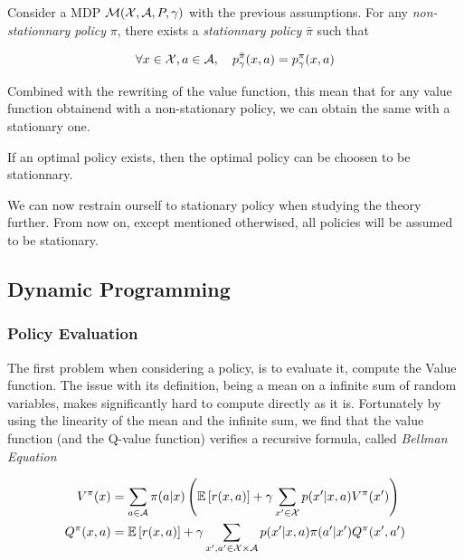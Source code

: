 \begin{theorem}[Bertsekas, 2007]
    Consider a MDP $\mathcal{M}(\mathcal{X}, \mathcal{A}, P, \gamma)$ with the previous assumptions. For any \emph{non-stationnary policy} $\pi$, there exists a \emph{stationnary policy} $\bar{\pi}$ such that 

    \[ \forall x\in \mathcal{X}, a \in \mathcal{A}, \quad p_\gamma^{\bar{\pi}}(x,a) = p_\gamma^{\pi}(x,a) \]
\end{theorem}

Combined with the rewriting of the value function, this mean that for any value function obtainend with a non-stationary policy, we can obtain the same with a stationary one. 

\begin{corollary}
    If an optimal policy exists, then the optimal policy can be choosen to be stationnary.
\end{corollary}

We can now restrain ourself to stationary policy when studying the theory further. From now on, except mentioned otherwised, all policies will be assumed to be stationary.

\subsection{Dynamic Programming}

\subsubsection*{Policy Evaluation} 

The first problem when considering a policy, is to evaluate it, \ie compute the Value function. The issue with its definition, being a mean on a infinite sum of random variables, makes significantly hard to compute directly as it is. Fortunately by using the linearity of the mean and the infinite sum, we find that the value function (and the Q-value function) verifies a recursive formula, called \emph{Bellman Equation}

\begin{align*}
V^\pi(x) &= \sum_{a \in \mathcal{A}} \pi(a|x) \left( \mathbb{E}\left[ r(x,a) \right] + \gamma \sum_{x^\prime  \in \mathcal{X}} p(x^\prime |x,a)V^\pi(x^\prime ) \right) \\
Q^\pi(x,a) &= \mathbb{E}\left[ r(x,a) \right] + \gamma \sum_{x^\prime ,a^\prime  \in \mathcal{X} \times \mathcal{A}} p(x^\prime |x,a)\pi(a^\prime |x^\prime )Q^\pi(x^\prime ,a^\prime )
\end{align*}

